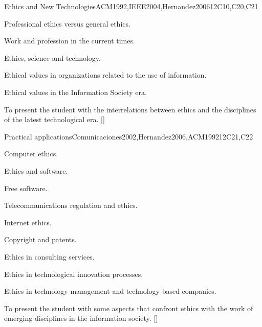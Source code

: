 \begin{syllabus}
\begin{unit}{}{Ethics and New Technologies}{ACM1992,IEEE2004,Hernandez2006}{12}{C10,C20,C21}
\begin{topics}
	\item Professional ethics versus general ethics.
	\item Work and profession in the current times.
	\item Ethics, science and technology.
	\item Ethical values in organizations related to the use of information.
	\item Ethical values in the Information Society era.
\end{topics}
\begin{learningoutcomes}
	\item To present the student with the interrelations between ethics and the disciplines of the latest technological era. [\Familiarity]
\end{learningoutcomes}
\end{unit}

\begin{unit}{}{Practical applications}{Comunicaciones2002,Hernandez2006,ACM1992}{12}{C21,C22}
\begin{topics}
    \item Computer ethics.
	\begin{subtopics}
	    \item Ethics and software.
	    \item Free software.
	\end{subtopics}
    \item Telecommunications regulation and ethics.
	\begin{subtopics}
	    \item Internet ethics.
	\end{subtopics}
    \item Copyright and patents.
    \item Ethics in consulting services.
    \item Ethics in technological innovation processes.
    \item Ethics in technology management and technology-based companies.
\end{topics}
\begin{learningoutcomes}
	\item To present the student with some aspects that confront ethics with the work of emerging disciplines in the information society. [\Familiarity]
\end{learningoutcomes}
\end{unit}

\begin{coursebibliography}
\end{coursebibliography}

\end{syllabus}
